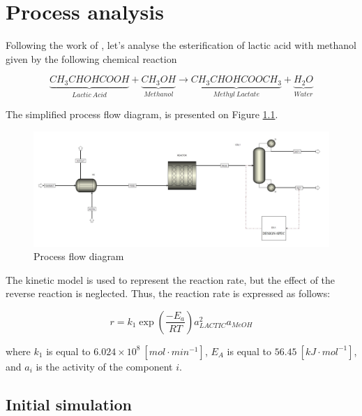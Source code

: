 \chapter{Process analysis}

Following the work of \cite{SegoviaHernandez2020}, let's analyse the esterification of lactic acid with methanol given by the following chemical reaction

\begin{equation}
	\underbrace{CH_3CHOHCOOH}_{Lactic~Acid} + \underbrace{CH_3OH}_{Methanol} \rightarrow \underbrace{CH_3CHOHCOOCH_3}_{Methyl~Lactate} + \underbrace{H_2O}_{Water}
\end{equation}

The simplified process flow diagram, is presented on Figure \ref{fig:Ester_PFD}.

\begin{figure}[h!]
	\centering
	\includegraphics[width=\textwidth]{Figures/Proces_Analysis/PFD.jpg}
	\caption{Process flow diagram}
	\label{fig:Ester_PFD}
\end{figure}

The kinetic model is used to represent the reaction rate, but the effect of the reverse reaction is neglected. Thus, the reaction rate is expressed as follows:

\begin{equation}
	r = k_1 \exp\left( \frac{-E_a}{RT} \right) a^2_{LACTIC} a_{MeOH}
\end{equation}

where $k_1$ is equal to $6.024 \times 10^8 ~[mol \cdot min^{-1}]$, $E_A$ is equal to $56.45~[kJ\cdot mol^{-1}]$, and $a_i$ is the activity of the component $i$.

\section{Initial simulation}

